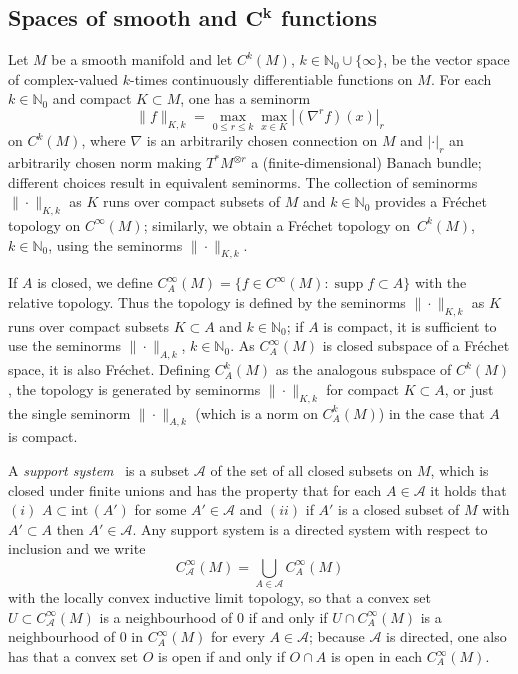 \documentclass[11pt]{article}
\numberwithin{equation}{section}
\numberwithin{equation}{section}
\newcommand{\NN}{{\mathbb N}}
\DeclareMathOperator{\supp}{supp}
\begin{document}
 \subsection[Spaces of smooth and C\^{}k functions]{Spaces of smooth and $\boldsymbol{C^k}$ functions}
 Let $M$ be a smooth manifold and let $C^k(M)$, $k\in\NN_0\cup\{\infty\}$, be the vector space of complex-valued $k$-times continuously differentiable functions on $M$. For each $k\in\NN_0$ and compact $K\subset M$, one has a seminorm
 \begin{equation*}
 	\|f\|_{K,k} = \max_{0\le r\le k} \max_{x\in K} |(\nabla^r f)(x)|_r
 \end{equation*}
 on $C^k(M)$, where $\nabla$ is an arbitrarily chosen connection on $M$ and $|\cdot|_r$ an arbitrarily chosen norm making $T^*M^{\otimes r}$ a (finite-dimensional) Banach bundle; different choices result in equivalent seminorms. The collection of seminorms $\|\cdot\|_{K,k}$ as $K$ runs over compact subsets of $M$ and $k\in\NN_0$ provides a Fr\'echet topology on $C^\infty(M)$; similarly,
 we obtain a Fr\'echet topology on~$C^k(M)$, $k\in\NN_0$, using the seminorms
 $\|\cdot\|_{K,k}$.


 If $A$ is closed, we define $C^\infty_A(M)=\{f\in C^\infty(M)\colon\supp f\subset A\}$ with the relative topology. Thus the topology is defined by the seminorms $\|\cdot\|_{K,k}$ as $K$ runs over compact subsets $K\subset A$ and $k\in\NN_0$; if $A$ is compact, it is sufficient to use the seminorms $\|\cdot\|_{A,k}$, $k\in\NN_0$. As $C^\infty_A(M)$ is closed subspace of a Fr\'echet space, it is also Fr\'echet. Defining $C^k_A(M)$ as the analogous subspace of $C^k(M)$, the topology is generated by seminorms $\|\cdot\|_{K,k}$ for compact $K\subset A$, or just the single seminorm $\|\cdot\|_{A,k}$ (which is a norm on $C^k_A(M)$) in the case that $A$ is compact.

 A \emph{support system}~\cite{Baer:2015} is a subset $\mathscr A$ of the set of all closed subsets on $M$, which is closed under finite unions and has the property that for each $A\in \mathscr A$ it holds that $(i)$
 $A\subset \textrm{int}\,(A')$ for some $A'\in\mathscr A$ and $(ii)$ if $A'$ is a closed subset of $M$ with $A'\subset A$ then $A'\in\mathscr A$. Any support system is a directed system with respect to inclusion and we write
 \begin{equation*}
 	C^\infty_{\mathscr{A}}(M)= \bigcup_{A\in\mathscr{A}} C^\infty_A(M)
 \end{equation*}
 with the locally convex inductive limit topology,
 so that a convex set $U\subset C^\infty_{\mathscr{A}}(M)$ is a neighbourhood of $0$
 if and only if $U\cap C^\infty_A(M)$ is a neighbourhood of $0$ in $C^\infty_A(M)$ for every $A\in\mathscr{A}$; because $\mathscr{A}$ is directed, one also has that
 a convex set $O$ is open if and only if $O\cap A$ is open in each $C^\infty_A(M)$.
\end{document}
